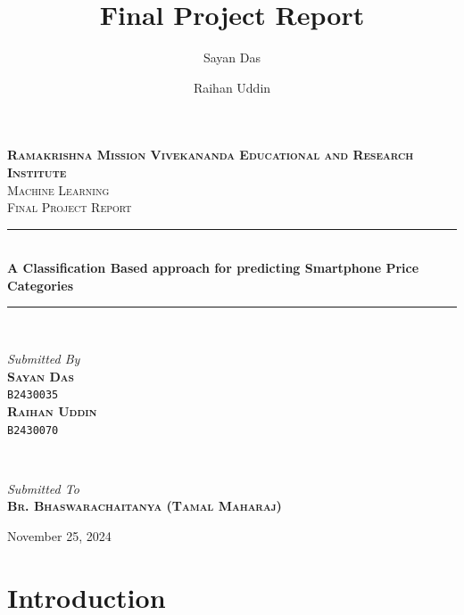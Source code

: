 \documentclass[12pt]{report}
\title{Final Project Report}
\author{
  Sayan Das
  \and
  Raihan Uddin
}
\begin{document}
\begin{titlepage}
	\newcommand{\HRule}{\rule{\linewidth}{0.5mm}}
	\center


	\textsc{\LARGE \textbf{Ramakrishna Mission Vivekananda Educational and Research Institute}}\\[1.5cm]

	\textsc{\LARGE Machine Learning}\\[0.5cm]

	\textsc{\large Final Project Report}\\[0.5cm]

	\HRule\\[0.4cm]

	{\huge\bfseries A Classification Based approach for predicting Smartphone Price Categories}\\[0.4cm]

	\HRule\\[1.5cm]



	\begin{minipage}{0.4\textwidth}
		\begin{flushleft}
			\large
			\textit{Submitted By}\\
			\textsc{\textbf{Sayan Das }}\\
			\vspace{-0.5em}
			\textsc{\texttt{B2430035 }}\\
			\textsc{\textbf{Raihan Uddin }}\\
			\vspace{-0.5em}
			\textsc{\texttt{B2430070} }\\
		\end{flushleft}
	\end{minipage}
	~
	\begin{minipage}{0.4\textwidth}
		\begin{flushright}
			\large
			\textit{Submitted To}\\
			\textbf{\textsc{Br. Bhaswarachaitanya (Tamal Maharaj)}}
		\end{flushright}
	\end{minipage}


	\vfill\vfill\vfill

	{\large November 25, 2024}

	\vfill

\end{titlepage}
\restoregeometry

\tableofcontents

\chapter{Introduction}
\end{document}
